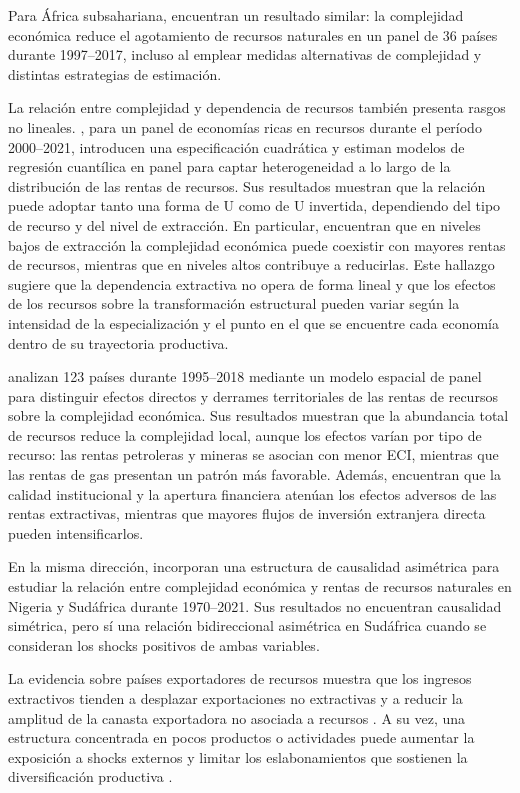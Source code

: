 \documentclass[../../PTFM.tex]{subfiles}
\begin{document}
	Para África subsahariana, \textcite{Kelly2024} encuentran un resultado similar: la complejidad económica reduce el agotamiento de recursos naturales en un panel de 36 países durante 1997--2017, incluso al emplear medidas alternativas de complejidad y distintas estrategias de estimación.

	La relación entre complejidad y dependencia de recursos también presenta rasgos no lineales. \textcite{Ul-Durar2023}, para un panel de economías ricas en recursos durante el período 2000--2021, introducen una especificación cuadrática y estiman modelos de regresión cuantílica en panel para captar heterogeneidad a lo largo de la distribución de las rentas de recursos. Sus resultados muestran que la relación puede adoptar tanto una forma de U como de U invertida, dependiendo del tipo de recurso y del nivel de extracción. En particular, encuentran que en niveles bajos de extracción la complejidad económica puede coexistir con mayores rentas de recursos, mientras que en niveles altos contribuye a reducirlas. Este hallazgo sugiere que la dependencia extractiva no opera de forma lineal y que los efectos de los recursos sobre la transformación estructural pueden variar según la intensidad de la especialización y el punto en el que se encuentre cada economía dentro de su trayectoria productiva.

	\textcite{Zhang2023} analizan 123 países durante 1995--2018 mediante un modelo espacial de panel para distinguir efectos directos y derrames territoriales de las rentas de recursos sobre la complejidad económica. Sus resultados muestran que la abundancia total de recursos reduce la complejidad local, aunque los efectos varían por tipo de recurso: las rentas petroleras y mineras se asocian con menor ECI, mientras que las rentas de gas presentan un patrón más favorable. Además, encuentran que la calidad institucional y la apertura financiera atenúan los efectos adversos de las rentas extractivas, mientras que mayores flujos de inversión extranjera directa pueden intensificarlos.

	En la misma dirección, \textcite{Olaniyi-Odhiambo2025-2} incorporan una estructura de causalidad asimétrica para estudiar la relación entre complejidad económica y rentas de recursos naturales en Nigeria y Sudáfrica durante 1970--2021. Sus resultados no encuentran causalidad simétrica, pero sí una relación bidireccional asimétrica en Sudáfrica cuando se consideran los shocks positivos de ambas variables.
	
	La evidencia sobre países exportadores de recursos muestra que los ingresos extractivos tienden a desplazar exportaciones no extractivas y a reducir la amplitud de la canasta exportadora no asociada a recursos \parencite{Harding2016,Bahar2018}. A su vez, una estructura concentrada en pocos productos o actividades puede aumentar la exposición a shocks externos y limitar los eslabonamientos que sostienen la diversificación productiva \parencite{Bahar2018,Joya2015,Lashitew2021}.
	
\end{document}
